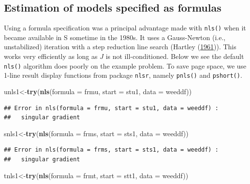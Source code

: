 \documentclass[
]{article}
\newenvironment{Shaded}{\begin{snugshade}}{\end{snugshade}}
\newcommand{\AttributeTok}[1]{\textcolor[rgb]{0.13,0.29,0.53}{#1}}
\newcommand{\FunctionTok}[1]{\textcolor[rgb]{0.13,0.29,0.53}{\textbf{#1}}}
\newcommand{\NormalTok}[1]{#1}
\newcommand{\OtherTok}[1]{\textcolor[rgb]{0.56,0.35,0.01}{#1}}
\begin{document}
\hypertarget{estimation-of-models-specified-as-formulas}{%
\subsection{Estimation of models specified as
formulas}\label{estimation-of-models-specified-as-formulas}}

Using a formula specification was a principal advantage made with
\texttt{nls()} when it became available in S sometime in the 1980s. It
uses a Gauss-Newton (i.e., unstabilized) iteration with a step reduction
line search (Hartley (\protect\hyperlink{ref-Hartley1961}{1961})). This
works very efficiently as long as \(J\) is not ill-conditioned. Below we
see the default \texttt{nls()} algorithm does poorly on the example
problem. To save page space, we use 1-line result display functions from
package \texttt{nlsr}, namely \texttt{pnls()} and \texttt{pshort()}.

\begin{Shaded}
\begin{Highlighting}[]
\NormalTok{unls1}\OtherTok{\textless{}{-}}\FunctionTok{try}\NormalTok{(}\FunctionTok{nls}\NormalTok{(}\AttributeTok{formula =}\NormalTok{ frmu, }\AttributeTok{start =}\NormalTok{ stu1, }\AttributeTok{data =}\NormalTok{ weeddf))}
\end{Highlighting}
\end{Shaded}

\begin{verbatim}
## Error in nls(formula = frmu, start = stu1, data = weeddf) : 
##   singular gradient
\end{verbatim}

\begin{Shaded}
\begin{Highlighting}[]
\NormalTok{snls1}\OtherTok{\textless{}{-}}\FunctionTok{try}\NormalTok{(}\FunctionTok{nls}\NormalTok{(}\AttributeTok{formula =}\NormalTok{ frms, }\AttributeTok{start =}\NormalTok{ sts1, }\AttributeTok{data =}\NormalTok{ weeddf))}
\end{Highlighting}
\end{Shaded}

\begin{verbatim}
## Error in nls(formula = frms, start = sts1, data = weeddf) : 
##   singular gradient
\end{verbatim}

\begin{Shaded}
\begin{Highlighting}[]
\NormalTok{tnls1}\OtherTok{\textless{}{-}}\FunctionTok{try}\NormalTok{(}\FunctionTok{nls}\NormalTok{(}\AttributeTok{formula =}\NormalTok{ frmt, }\AttributeTok{start =}\NormalTok{ stt1, }\AttributeTok{data =}\NormalTok{ weeddf))}
\end{Highlighting}
\end{Shaded}
\end{document}
